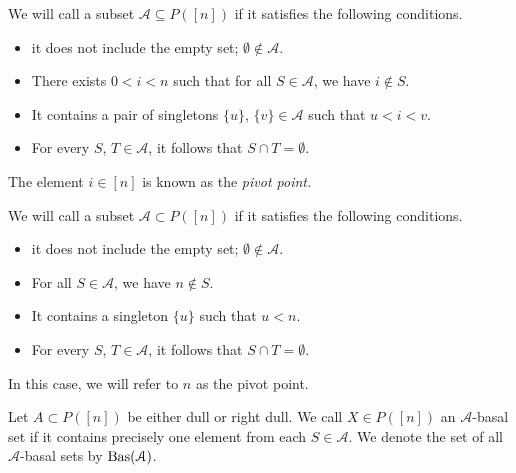 \documentclass[main.tex]{subfiles}
\begin{document}
\begin{definition}
  We will call a subset $\mathcal{A} \subseteq P([n])$  if it satisfies the following conditions.
  \begin{itemize}
    \item it does not include the empty set; $\emptyset \notin \mathcal{A}$.

    \item There exists $0 < i < n$ such that for all $S \in \mathcal{A}$, we have $i \notin S$.

    \item It contains a pair of singletons $\{u\}$, $\{v\} \in \mathcal{A}$ such that $u < i < v$.

    \item For every $S$, $T \in \mathcal{A}$, it follows that $S \cap T = \emptyset$.
  \end{itemize}

  The element $i \in [n]$ is known as the \emph{pivot point.}
\end{definition}

\begin{definition}
  We will call a subset $\mathcal{A} \subset P([n])$  if it satisfies the following conditions.
  \begin{itemize}
    \item it does not include the empty set; $\emptyset \notin \mathcal{A}$.

    \item For all $S \in \mathcal{A}$, we have $n \notin S$.

    \item It contains a singleton $\{u\}$ such that $u < n$.

    \item For every $S$, $T \in \mathcal{A}$, it follows that $S \cap T = \emptyset$.
  \end{itemize}

  In this case, we will refer to $n$ as the pivot point.
\end{definition}

\begin{definition}
  Let $A \subset P([n])$ be either dull or right dull. We call $X \in P([n])$ an $\mathcal{A}$-basal set if it contains precisely one element from each $S \in \mathcal{A}$. We denote the set of all $\mathcal{A}$-basal sets by $\mathrm{Bas}(\mathcal{A})$.
\end{definition}
\end{document}
